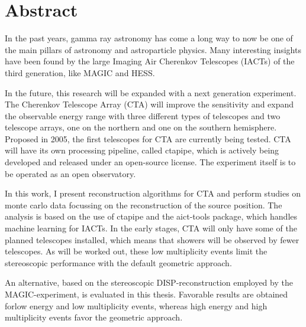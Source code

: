 \thispagestyle{plain}

\section*{Abstract}
In the past years, gamma ray astronomy has come a long way
to now be one of the main pillars of astronomy and astroparticle physics.
Many interesting insights have been found by the large Imaging Air Cherenkov Telescopes (IACTs) 
of the third generation, like MAGIC and HESS.

In the future, this research will be expanded with a next generation experiment.
The Cherenkov Telescope Array (CTA) will improve the sensitivity and
expand the observable energy range with 
three different types of telescopes and two telescope arrays, one on the northern and 
one on the southern hemisphere.
Proposed in 2005, the first telescopes for CTA are currently being tested.
CTA will have its own processing pipeline, called ctapipe, which is
actively being developed and released under an open-source license.
The experiment itself is to be operated as an open observatory.

In this work, I present reconstruction algorithms for CTA and perform 
studies on monte carlo data focussing on the reconstruction of the source position.
The analysis is based on the use of ctapipe and the
aict-tools package, which handles machine learning for IACTs.
In the early stages, CTA will only have some of the planned telescopes installed,
which means that showers will be observed by fewer telescopes.
As will be worked out, these low multiplicity events limit the stereoscopic
performance with the default geometric approach.

An alternative, based on the stereoscopic DISP-reconstruction employed by
the MAGIC-experiment, is evaluated in this thesis.
Favorable results are obtained forlow energy and low multiplicity
events, whereas
high energy and high multiplicity events favor the geometric approach.
